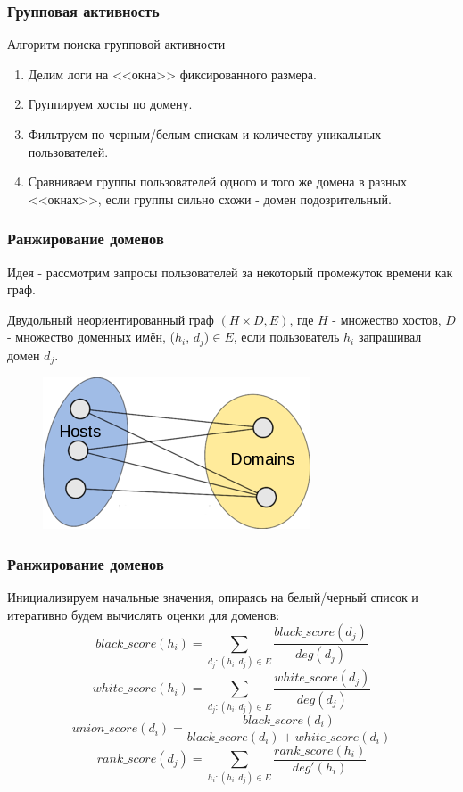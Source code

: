 \documentclass[10pt,pdf,hyperref={unicode}]{beamer}
\begin{document}
\begin{frame}
\frametitle{Групповая активность}
Алгоритм поиска групповой активности
\begin{enumerate}
	\item Делим логи на <<окна>> фиксированного размера.
	\item Группируем хосты по домену.
	\item Фильтруем по черным/белым спискам и количеству уникальных пользователей.
	\item Сравниваем группы пользователей одного и того же домена в разных <<окнах>>, если группы сильно схожи - домен подозрительный.
\end{enumerate}
\end{frame}

\begin{frame}
\frametitle{Ранжирование доменов}
Идея - рассмотрим запросы пользователей за некоторый промежуток времени как граф.
\newline
\begin{definition}Двудольный неориентированный граф $(H\times D,  E)$, 
где $H$ - множество хостов, $D$ - множество доменных имён, ($h_i$, $d_j$)$\in$$E$, если пользователь $h_i$ запрашивал домен $d_j$. 
\end{definition}

\begin{figure}[H]
	\centering
	\includegraphics[scale=2.]{b_graph.png}
\end{figure}
\end{frame}


\begin{frame}
\frametitle{Ранжирование доменов}
Инициализируем начальные значения, опираясь на белый/черный список и итеративно будем вычислять оценки для доменов:
\begin{equation}
	\label{eq:dr1-black}
	black\_score(h_i) = \sum_{d_j: (h_i, d_j)\in E} \frac{black\_score(d_j)}{deg(d_j)}
\end{equation}
\begin{equation}
	\label{eq:dr1-white}
	white\_score(h_i) = \sum_{d_j: (h_i, d_j)\in E} \frac{white\_score(d_j)}{deg(d_j)}
\end{equation}
\begin{equation}
	\label{eq:dr1-union}
	union\_score(d_i) = \frac{black\_score(d_i)}{black\_score(d_i) + white\_score(d_i)}
\end{equation}
\begin{equation}
	\label{eq:dr2-rank}
	rank\_score(d_j) = \sum_{h_i: (h_i, d_j)\in E} \frac{rank\_score(h_i)}{deg'(h_i)}
\end{equation}
\end{frame}
\end{document}
